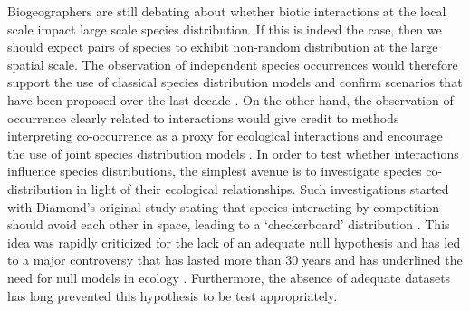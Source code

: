 Biogeographers are still debating about whether biotic interactions at
the local scale impact large scale species distribution. If this is
indeed the case, then we should expect pairs of species to exhibit
non-random distribution at the large spatial scale. The observation of
independent species occurrences would therefore support the use of
classical species distribution models \citep[hereinafter
SDMs,][]{Elith2006} and confirm scenarios that have been proposed over
the last decade \citep{Thuiller2005, Thuiller2011, Albouy2012}. On the
other hand, the observation of occurrence clearly related to
interactions would give credit to methods interpreting co-occurrence as
a proxy for ecological interactions \citep{Morales-Castilla2015} and
encourage the use of joint species distribution models \citep[hereafter
JSDM,][]{Ovaskainen2010, Pollock2014}. In order to test whether
interactions influence species distributions, the simplest avenue is to
investigate species co-distribution in light of their ecological
relationships. Such investigations started with Diamond's original study
stating that species interacting by competition should avoid each other
in space, leading to a `checkerboard' distribution \citep{Diamond1975}.
This idea was rapidly criticized for the lack of an adequate null
hypothesis \citep{Connor1979, Gilpin1982} and has led to a major
controversy that has lasted more than 30 years \citep{Connor2013} and
has underlined the need for null models in ecology
\citep{Connor1983, Gotelli2000}. Furthermore, the absence of adequate
datasets has long prevented this hypothesis to be test appropriately.

